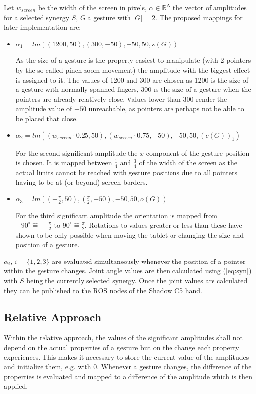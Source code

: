 Let $w_{screen}$ be the width of the screen in pixels, $\alpha \in \mathbb{R}^N$ the vector of amplitudes for a selected synergy $S$, $G$ a gesture with $|G| = 2$. The proposed mappings for later implementation are:
\begin{itemize}
	\item $\alpha_1 = lm\left((1200, 50), (300, -50), -50, 50, s(G)\right)$
	
	As the size of a gesture is the property easiest to manipulate (with 2 pointers by the so-called pinch-zoom-movement) the amplitude with the biggest effect is assigned to it. The values of 1200 and 300 are chosen as 1200 is the size of a gesture with normally spanned fingers, 300 is the size of a gesture when the pointers are already relatively close. Values lower than 300 render the amplitude value of $-50$ unreachable, as pointers are perhaps not be able to be placed that close.
	
	\item $\alpha_2 = lm\left((w_{screen} \cdot 0.25, 50), (w_{screen} \cdot 0.75, -50), -50, 50, (c(G))_1\right)$
	
	For the second significant amplitude the $x$ component of the gesture position is chosen. It is mapped between $\frac{1}{4}$ and $\frac{3}{4}$ of the width of the screen as the actual limits cannot be reached with gesture positions due to all pointers having to be at (or beyond) screen borders.
	
	\item $\alpha_3 = lm\left( \left( -\frac{\pi}{2}, 50 \right), \left( \frac{\pi}{2}, -50 \right), -50, 50, o(G) \right)$
	
	For the third significant amplitude the orientation is mapped from $-90^\circ \widehat{=} -\frac{\pi}{2}$ to $90^\circ \widehat{=} \frac{\pi}{2}$. Rotations to values greater or less than these have shown to be only possible when moving the tablet or changing the size and position of a gesture.
\end{itemize}

$\alpha_i,\,i=\{1,2,3\}$ are evaluated simultaneously whenever the position of a pointer within the gesture changes. Joint angle values are then calculated using (\ref{eq:syn}) with $S$ being the currently selected synergy. Once the joint values are calculated they can be published to the ROS nodes of the Shadow C5 hand.

\subsection{Relative Approach}
\label{sec:app:rel}
Within the relative approach, the values of the significant amplitudes shall not depend on the actual properties of a gesture but on the change each property experiences. This makes it necessary to store the current value of the amplitudes and initialize them, e.g. with 0. Whenever a gesture changes, the difference of the properties is evaluated and mapped to a difference of the amplitude which is then applied.

